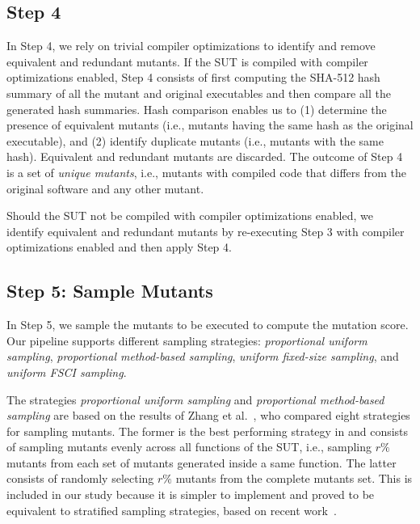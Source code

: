\subsection{Step 4}

In Step 4, we rely on trivial compiler optimizations to identify and remove equivalent and redundant mutants. If the SUT is compiled with compiler optimizations enabled, Step 4 consists of first computing the SHA-512 hash summary of all the mutant and original executables and then compare all the generated hash summaries. Hash comparison enables us to (1) determine the presence of equivalent mutants (i.e., mutants having the same hash as the original executable), and (2) identify duplicate mutants (i.e., mutants with the same hash). %
Equivalent and redundant mutants are discarded.
The outcome of Step 4 is a set of \emph{unique mutants}, i.e., mutants with compiled code that differs from the original software and any other mutant.

Should the SUT not be compiled with compiler optimizations enabled, we identify equivalent and redundant mutants by re-executing Step 3 with compiler optimizations enabled and then apply Step 4.

\subsection{Step 5: Sample Mutants}
\label{sec:codeDriven:samplingStep}
\STARTCHANGEDNOV

In Step 5, we sample the mutants to be executed to compute the mutation score. 
Our pipeline supports different sampling strategies: \emph{proportional uniform sampling}, \emph{proportional method-based sampling},  \emph{uniform fixed-size sampling}, and \emph{uniform FSCI sampling}. 

The strategies \emph{proportional uniform sampling} and \emph{proportional method-based sampling} are based on the results of Zhang et al.~\cite{zhang2013operator}, who compared eight strategies for sampling mutants. 
The former is the best performing strategy in \cite{zhang2013operator} and consists of sampling mutants evenly across all functions of the SUT, i.e., sampling $r\%$ mutants from each set of mutants generated inside a same function.
 {The latter consists of randomly selecting $r\%$ mutants from the complete mutants set. This is included in our study because it is simpler to implement and proved to be equivalent to stratified sampling strategies, based on recent work~\cite{gopinath2015hard}.}

